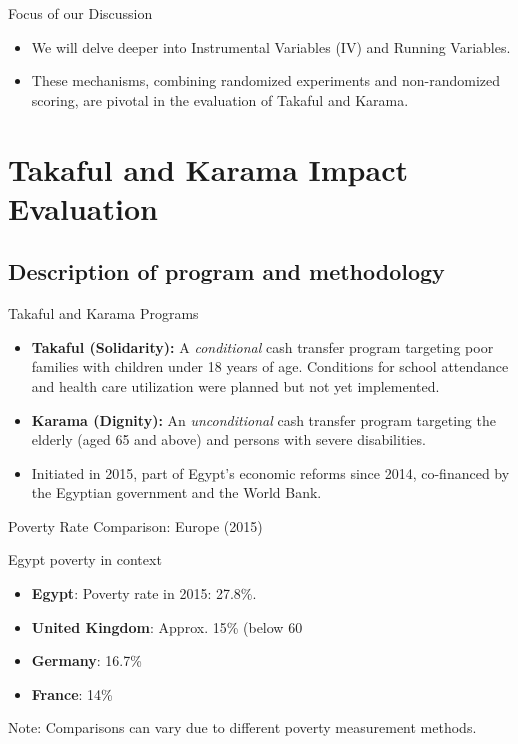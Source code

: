 \documentclass{beamer}
\begin{document}
\begin{frame}{Focus of our Discussion}
\begin{itemize}
\item We will delve deeper into Instrumental Variables (IV) and Running Variables.
\item These mechanisms, combining randomized experiments and non-randomized scoring, are pivotal in the evaluation of Takaful and Karama.
\end{itemize}
\end{frame}



\section{Takaful and Karama Impact Evaluation}

\subsection{Description of program and methodology}

\begin{frame}{Takaful and Karama Programs}
\begin{itemize}
    \item \textbf{Takaful (Solidarity):} A \textit{conditional} cash transfer program targeting poor families with children under 18 years of age. Conditions for school attendance and health care utilization were planned but not yet implemented.
    \item \textbf{Karama (Dignity):} An \textit{unconditional} cash transfer program targeting the elderly (aged 65 and above) and persons with severe disabilities.
\item Initiated in 2015, part of Egypt's economic reforms since 2014, co-financed by the Egyptian government and the World Bank.
\end{itemize}
\end{frame}

\begin{frame}{Poverty Rate Comparison: Europe (2015)}

Egypt poverty in context

\begin{itemize}
    \item \textbf{Egypt}: Poverty rate in 2015: 27.8\%.
    \item \textbf{United Kingdom}: Approx. 15\% (below 60%
    \item \textbf{Germany}: 16.7\%
    \item \textbf{France}: 14\%
\end{itemize}
\small Note: Comparisons can vary due to different poverty measurement methods.
\end{frame}
\end{document}
